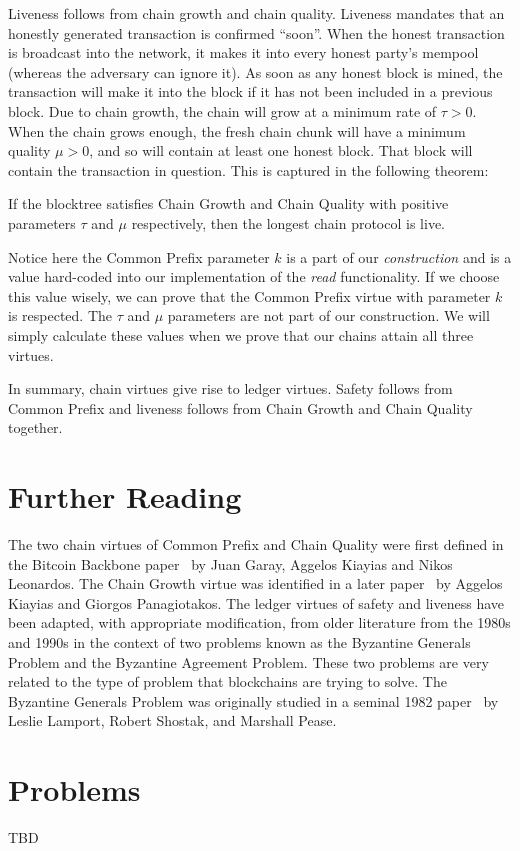 Liveness follows from chain growth and chain quality.
Liveness mandates that an honestly generated transaction is confirmed ``soon''.
When the honest transaction is broadcast into the network, it makes it into every
honest party's mempool (whereas the adversary can ignore it). As soon as any honest
block is mined, the transaction will make it into the block if it has not been
included in a previous block. Due to chain growth, the chain will grow at a minimum
rate of $\tau > 0$. When the chain grows enough, the fresh chain chunk will have a minimum
quality $\mu > 0$, and so will contain at least one honest block. That block will
contain the transaction in question. This is captured in the following theorem:

\begin{theorem}
    If the blocktree satisfies Chain Growth and Chain Quality with positive parameters $\tau$
    and $\mu$ respectively, then the longest chain protocol is live.
\end{theorem}

Notice here the Common Prefix parameter $k$ is a part of our \emph{construction} and is a value
hard-coded into our implementation of the \emph{read} functionality. If we choose this value
wisely, we can prove that the Common Prefix virtue with parameter $k$ is respected. The $\tau$
and $\mu$ parameters are not part of our construction. We will simply calculate these values
when we prove that our chains attain all three virtues.

In summary, chain virtues give rise to ledger virtues. Safety follows from Common Prefix
and liveness follows from Chain Growth and Chain Quality together.

\section{Further Reading}
The two chain virtues of Common Prefix and Chain Quality were first defined in the Bitcoin Backbone paper~\cite{backbone}
by Juan Garay, Aggelos Kiayias and Nikos Leonardos. The Chain Growth virtue was identified in a later paper~\cite{speedsecurity}
by Aggelos Kiayias and Giorgos Panagiotakos. The ledger virtues of safety and liveness have been adapted, with appropriate
modification, from older literature from the 1980s and 1990s in the context of two problems known as the Byzantine Generals
Problem and the Byzantine Agreement Problem. These two problems are very related to the type of problem that blockchains
are trying to solve. The Byzantine Generals Problem was originally studied in a seminal 1982 paper~\cite{lamport} by Leslie Lamport,
Robert Shostak, and Marshall Pease.

\section{Problems}

TBD
